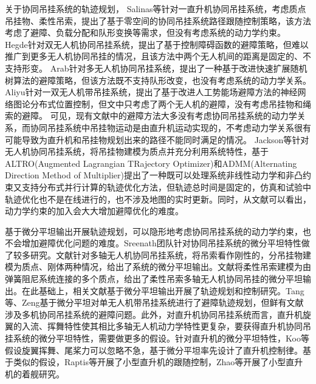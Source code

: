 关于协同吊挂系统的轨迹规划，
Salinas等\cite{salinas2018null}针对一直升机协同吊挂系统，考虑质点吊挂物、柔性吊索，提出了基于零空间的协同吊挂系统路径跟随控制策略，该方法考虑了避障、负载分配和队形变换等需求，但没有考虑系统的动力学约束。
Hegde\cite{hegde2021multi}针对双无人机协同吊挂系统，提出了基于控制障碍函数的避障策略，但难以推广到更多无人机协同吊挂的情况，且该方法中两个无人机间的距离是固定的、不支持形变。
Arab\cite{arab2021planning}针对多无人机协同吊挂系统，提出了一种基于改进快速扩展随机树算法的避障策略，但该方法既不支持队形改变，也没有考虑系统的动力学关系。
Aliyu\cite{aliyu2022control}针对一双无人机带吊挂系统，提出了基于改进人工势能场避障方法的神经网络图论分布式位置控制，但文中只考虑了两个无人机的避障，没有考虑吊挂物和绳索的避障。
可见，现有文献中的避障方法大多没有考虑协同吊挂系统的动力学关系，而协同吊挂系统中吊挂物运动是由直升机运动实现的，不考虑动力学关系很有可能导致为直升机和吊挂物规划出来的路径不能同时满足的情况。
Jackson等\cite{jackson2020scalable}针对无人机协同吊挂系统，将吊挂物建模为质点并充分利用系统特性，基于ALTRO(Augmented Lagrangian TRajectory Optimizer)\cite{howell2019altro}和ADMM(Alternating Direction Method of Multiplier)提出了一种既可以处理系统非线性动力学和非凸约束又支持分布式并行计算的轨迹优化方法，但轨迹总时间是固定的，仿真和试验中轨迹优化也不是在线进行的，也不涉及地图的实时更新。同时，从文献\cite{jackson2020scalable}可以看出，动力学约束的加入会大大增加避障优化的难度。

基于微分平坦输出开展轨迹规划，可以隐形地考虑协同吊挂系统的动力学约束，也不会增加避障优化问题的难度。Sreenath团队\cite{sreenath2013trajectory, sreenath2013dynamics, wu2014geometric, kotaru2018differential}针对协同吊挂系统的微分平坦特性做了较多研究。文献\cite{sreenath2013dynamics}针对多轴无人机协同吊挂系统，将吊索看作刚性的，分吊挂物建模为质点、刚体两种情况，给出了系统的微分平坦输出。文献\cite{kotaru2018differential}将柔性吊索建模为由弹簧阻尼系统连接的多个质点，给出了柔性吊索多轴无人机协同吊挂的微分平坦输出。在此基础上，相关文献\cite{sreenath2013trajectory, sreenath2013dynamics, wu2014geometric, kotaru2018differential, valentim2019multi}基于微分平坦输出开展了轨迹规划和控制研究。Tang等\cite{tang2015mixed}、Zeng\cite{zeng2020differential}基于微分平坦对单无人机带吊挂系统进行了避障轨迹规划，但鲜有文献涉及多机协同吊挂系统的避障问题。此外，对直升机协同吊挂系统而言，直升机旋翼的入流、挥舞特性使其相比多轴无人机动力学特性更复杂，要获得直升机协同吊挂系统的微分平坦特性，需要做更多的假设。针对直升机的微分平坦特性，Koo等\cite{koo1999differential}假设旋翼挥舞、尾桨力可以忽略不急，基于微分平坦率先设计了直升机控制律。基于类似的假设，Raptis等\cite{raptis2011linear}开展了小型直升机的跟随控制，Zhao\cite{zhao2021differential}等开展了小型直升机的着舰研究。

